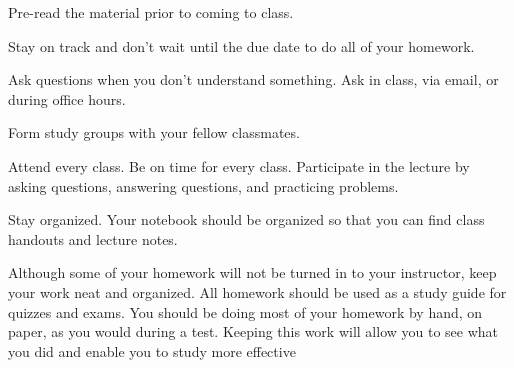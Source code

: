 \begin{outline}

	\1  Pre-read the material prior to coming to class.

	\1 Stay on track and don't wait until the due date to do all of your homework.

	\1  Ask questions when you don't understand something. Ask in class, via email, or during office hours.

	\1 Form study groups with your fellow classmates.

	\1  Attend every class. Be on time for every class. Participate in the lecture by asking questions, answering questions, and practicing problems.

	\1 Stay organized. Your notebook should be organized so that you can find class handouts and lecture notes.

	\1  Although some of your homework will not be turned in to your instructor, keep your work neat and organized. All homework should be used as a study guide for quizzes and exams. You should be doing most of your homework by hand, on paper, as you would during a test. Keeping this work will allow you to see what you did and enable you to study more effective

\end{outline}